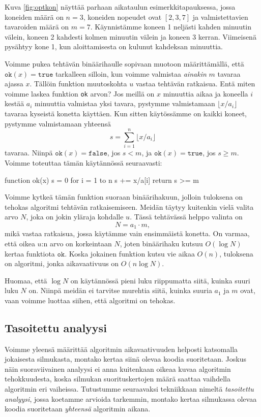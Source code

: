 Kuva \ref{fig:optkon} näyttää parhaan aikataulun esimerkkitapauksessa,
jossa koneiden määrä on $n=3$, koneiden nopeudet ovat $[2,3,7]$ ja
valmistettavien tavaroiden määrä on $m=7$.
Käynnistämme koneen 1 neljästi kahden minuutin välein,
koneen 2 kahdesti kolmen minuutin välein ja koneen 3 kerran.
Viimeisenä pysähtyy kone 1, kun aloittamisesta
on kulunut kahdeksan minuuttia.

Voimme pukea tehtävän binäärihaulle sopivaan muotoon määrittämällä,
että $\texttt{ok}(x)=\texttt{true}$ tarkalleen silloin, kun voimme valmistaa
\emph{ainakin} $m$ tavaraa ajassa $x$.
Tällöin funktion muutoskohta $u$ vastaa tehtävän ratkaisua.
Entä miten voimme laskea funktion \texttt{ok} arvon?
Jos meillä on $x$ minuuttia aikaa ja koneella $i$ kestää $a_i$
minuuttia valmistaa yksi tavara, pystymme valmistamaan
$\lfloor x/a_i \rfloor$ tavaraa kyseistä konetta käyttäen.
Kun sitten käytössämme on kaikki koneet,
pystymme valmistamaan yhteensä
\[ s = \sum_{i=1}^n \lfloor x/a_i \rfloor \]
tavaraa. Niinpä $\texttt{ok}(x)=\texttt{false}$, jos $s<m$,
ja $\texttt{ok}(x)=\texttt{true}$, jos $s \ge m$.
Voimme toteuttaa tämän käytännössä seuraavasti:

\begin{code}
function ok(x)
    s = 0
    for i = 1 to n
        s += x/a[i]
    return s >= m
\end{code}

Voimme kytkeä tämän funktion suoraan binäärihakuun,
jolloin tuloksena on tehokas algoritmi tehtävän ratkaisemiseen.
Meidän täytyy kuitenkin vielä valita arvo $N$,
joka on jokin yläraja kohdalle $u$.
Tässä tehtävässä helppo valinta on
\[N = a_1 \cdot m,\]
mikä vastaa ratkaisua, jossa käytämme vain ensimmäistä konetta.
On varmaa, että oikea $u$:n arvo on korkeintaan $N$,
joten binäärihaku kutsuu $O(\log N)$ kertaa funktiota $\texttt{ok}$.
Koska jokainen funktion kutsu vie aikaa $O(n)$,
tuloksena on algoritmi, jonka aikavaativuus on $O(n \log N)$.

Huomaa, että $\log N$ on käytännössä pieni luku riippumatta
siitä, kuinka suuri luku $N$ on.
Niinpä meidän ei tarvitse murehtia siitä,
kuinka suuria $a_1$ ja $m$ ovat,
vaan voimme luottaa siihen, että algoritmi on tehokas.

\subsection{Tasoitettu analyysi}


Voimme yleensä määrittää algoritmin aikavaativuuden
helposti katsomalla jokaisesta silmukasta,
montako kertaa siinä olevaa koodia suoritetaan.
Joskus näin suoraviivainen analyysi ei anna kuitenkaan
oikeaa kuvaa algoritmin tehokkuudesta,
koska silmukan suorituskertojen määrä saattaa vaihdella
algoritmin eri vaiheissa.
Tutustumme seuraavaksi tekniikkaan nimeltä
\emph{tasoitettu analyysi}, jossa koetamme arvioida tarkemmin,
montako kertaa silmukassa olevaa koodia suoritetaan
\emph{yhteensä} algoritmin aikana.

